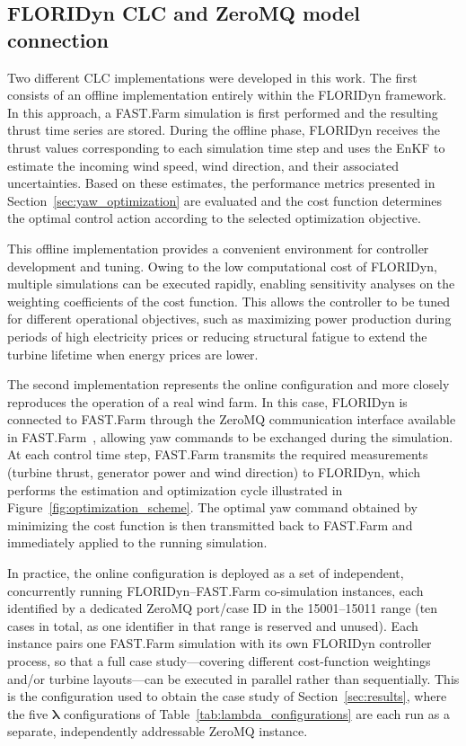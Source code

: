 \documentclass[final,5p,times,twocolumn]{elsarticle}
\begin{document}
\subsection{FLORIDyn CLC and ZeroMQ model connection}
\label{sec:CLC_FLORIDyn}

Two different CLC implementations were developed in this work. The first consists of an offline implementation entirely within the FLORIDyn framework. In this approach, a FAST.Farm simulation is first performed and the resulting thrust time series are stored. During the offline phase, FLORIDyn receives the thrust values corresponding to each simulation time step and uses the EnKF to estimate the incoming wind speed, wind direction, and their associated uncertainties. Based on these estimates, the performance metrics presented in Section~\ref{sec:yaw_optimization} are evaluated and the cost function determines the optimal control action according to the selected optimization objective.

This offline implementation provides a convenient environment for controller development and tuning. Owing to the low computational cost of FLORIDyn, multiple simulations can be executed rapidly, enabling sensitivity analyses on the weighting coefficients of the cost function. This allows the controller to be tuned for different operational objectives, such as maximizing power production during periods of high electricity prices or reducing structural fatigue to extend the turbine lifetime when energy prices are lower.

The second implementation represents the online configuration and more closely reproduces the operation of a real wind farm. In this case, FLORIDyn is connected to FAST.Farm through the ZeroMQ communication interface available in FAST.Farm~\cite{rosco_docs_zeromq}, allowing yaw commands to be exchanged during the simulation. At each control time step, FAST.Farm transmits the required measurements (turbine thrust, generator power and wind direction) to FLORIDyn, which performs the estimation and optimization cycle illustrated in Figure~\ref{fig:optimization_scheme}. The optimal yaw command obtained by minimizing the cost function is then transmitted back to FAST.Farm and immediately applied to the running simulation.

In practice, the online configuration is deployed as a set of independent, concurrently running FLORIDyn--FAST.Farm co-simulation instances, each identified by a dedicated ZeroMQ port/case ID in the 15001--15011 range (ten cases in total, as one identifier in that range is reserved and unused). Each instance pairs one FAST.Farm simulation with its own FLORIDyn controller process, so that a full case study---covering different cost-function weightings and/or turbine layouts---can be executed in parallel rather than sequentially. This is the configuration used to obtain the case study of Section~\ref{sec:results}, where the five $\boldsymbol{\lambda}$ configurations of Table~\ref{tab:lambda_configurations} are each run as a separate, independently addressable ZeroMQ instance.
\end{document}
